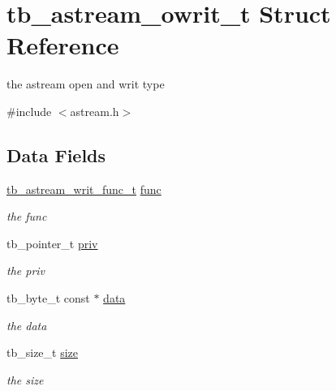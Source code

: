 \hypertarget{structtb__astream__owrit__t}{\section{tb\-\_\-astream\-\_\-owrit\-\_\-t Struct Reference}
\label{structtb__astream__owrit__t}
}


the astream open and writ type  




{\ttfamily \#include $<$astream.\-h$>$}

\subsection*{Data Fields}
\begin{DoxyCompactItemize}
\item 
\hypertarget{structtb__astream__owrit__t_afce3b0c92ff389f4e3faba6a2c4833ff}{\hyperlink{astream_8h_afbb9676c016d2e631bf4bc06836f4a45}{tb\-\_\-astream\-\_\-writ\-\_\-func\-\_\-t} \hyperlink{structtb__astream__owrit__t_afce3b0c92ff389f4e3faba6a2c4833ff}{func}}\label{structtb__astream__owrit__t_afce3b0c92ff389f4e3faba6a2c4833ff}

\begin{DoxyCompactList}\small\item\em the func \end{DoxyCompactList}\item 
\hypertarget{structtb__astream__owrit__t_a5f9f086e410d957e9fd90b41abb538a0}{tb\-\_\-pointer\-\_\-t \hyperlink{structtb__astream__owrit__t_a5f9f086e410d957e9fd90b41abb538a0}{priv}}\label{structtb__astream__owrit__t_a5f9f086e410d957e9fd90b41abb538a0}

\begin{DoxyCompactList}\small\item\em the priv \end{DoxyCompactList}\item 
\hypertarget{structtb__astream__owrit__t_afb558422a898531d392cf5eb7088d221}{tb\-\_\-byte\-\_\-t const $\ast$ \hyperlink{structtb__astream__owrit__t_afb558422a898531d392cf5eb7088d221}{data}}\label{structtb__astream__owrit__t_afb558422a898531d392cf5eb7088d221}

\begin{DoxyCompactList}\small\item\em the data \end{DoxyCompactList}\item 
\hypertarget{structtb__astream__owrit__t_a79e35622a93df8cebe9defe43922b8e8}{tb\-\_\-size\-\_\-t \hyperlink{structtb__astream__owrit__t_a79e35622a93df8cebe9defe43922b8e8}{size}}\label{structtb__astream__owrit__t_a79e35622a93df8cebe9defe43922b8e8}

\begin{DoxyCompactList}\small\item\em the size \end{DoxyCompactList}\end{DoxyCompactItemize}


